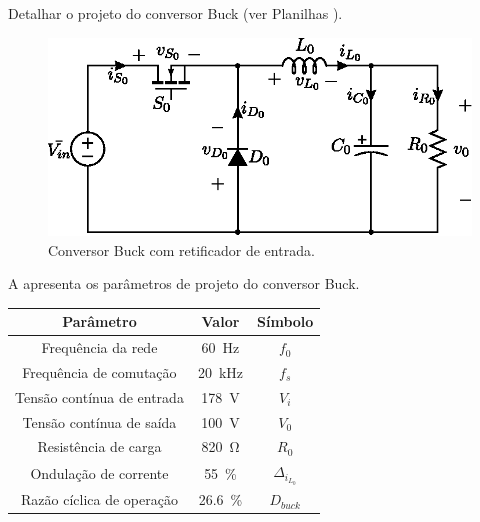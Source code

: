 Detalhar o projeto do conversor Buck (ver Planilhas \cite{noauthor_ptc_nodate}).

\begin{figure}[!h]
	\centering
	\includegraphics[width=0.9\linewidth]{Figs/Buck}
	\caption{Conversor Buck com retificador de entrada.}
	\label{fig:buck}
\end{figure}


A  apresenta os parâmetros de projeto do conversor Buck.

\begin{center}
	\label{tab:parametrosBuck}
	\begin{tabular}{@{}ccc@{}}
		\toprule
		\textbf{Parâmetro} & \textbf{Valor} & \textbf{Símbolo} \\ \midrule			
		Frequência  da rede        & \SI{60}{\hertz}     & $f_0$  \\		
		Frequência de comutação        & \SI{20}{\kilo\hertz}     & $f_s$  \\	
		Tensão contínua de entrada         &  \SI{178}{\V}      & $V_i$  \\
		Tensão contínua de saída         &  \SI{100}{\V}      & $V_0$  \\
		Resistência de carga        & \SI{820}{\ohm}      & $R_0$  \\
		Ondulação de corrente       & \SI{55}{\%}    & $\Delta_{i_{L_0}}$    \\ 
		Razão cíclica de operação       & \SI{26.6}{\%}    & $D_{buck}$    \\  \bottomrule	
	\end{tabular}
\end{center}

